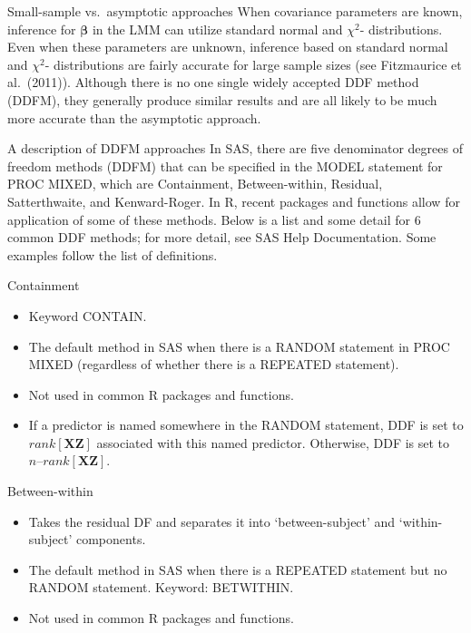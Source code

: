 \documentclass[
  9pt,
  ignorenonframetext,
]{beamer}
\begin{document}
\begin{frame}{Small-sample vs.~asymptotic approaches}
\protect\hypertarget{small-sample-vs.-asymptotic-approaches}{}
When covariance parameters are known, inference for \(\pmb \beta\) in
the LMM can utilize standard normal and \(\chi^2\)- distributions. Even
when these parameters are unknown, inference based on standard normal
and \(\chi^2\)- distributions are fairly accurate for large sample sizes
(see Fitzmaurice et al.~(2011)). Although there is no one single widely
accepted DDF method (DDFM), they generally produce similar results and
are all likely to be much more accurate than the asymptotic approach.

\begin{block}{A description of DDFM approaches}
\protect\hypertarget{a-description-of-ddfm-approaches}{}
In SAS, there are five denominator degrees of freedom methods (DDFM)
that can be specified in the MODEL statement for PROC MIXED, which are
Containment, Between-within, Residual, Satterthwaite, and Kenward-Roger.
In R, recent packages and functions allow for application of some of
these methods. Below is a list and some detail for 6 common DDF methods;
for more detail, see SAS Help Documentation. Some examples follow the
list of definitions.
\end{block}
\end{frame}

\begin{frame}{Containment}
\protect\hypertarget{containment}{}
\begin{itemize}
\item
  Keyword CONTAIN.
\item
  The default method in SAS when there is a RANDOM statement in PROC
  MIXED (regardless of whether there is a REPEATED statement).
\item
  Not used in common R packages and functions.
\item
  If a predictor is named somewhere in the RANDOM statement, DDF is set
  to \(rank[\pmb X \pmb Z]\) associated with this named predictor.
  Otherwise, DDF is set to \(n–rank[\pmb X \pmb Z]\).
\end{itemize}
\end{frame}

\begin{frame}{Between-within}
\protect\hypertarget{between-within}{}
\begin{itemize}
\item
  Takes the residual DF and separates it into `between-subject' and
  `within-subject' components.
\item
  The default method in SAS when there is a REPEATED statement but no
  RANDOM statement. Keyword: BETWITHIN.
\item
  Not used in common R packages and functions.
\end{itemize}
\end{frame}
\end{document}
